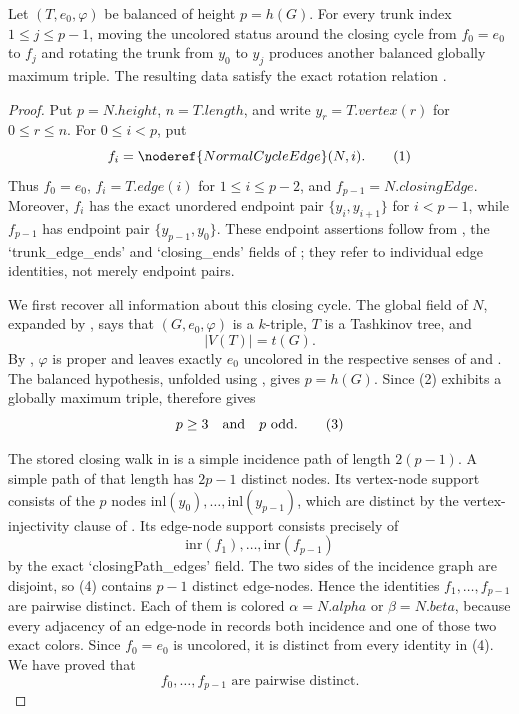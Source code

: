 \begin{lemma}
Let $(T,e_0,\varphi)$ be balanced of height $p=h(G)$.  For every trunk
index $1\le j\le p-1$, moving the uncolored status around the closing cycle
from $f_0=e_0$ to $f_j$ and rotating the trunk from $y_0$ to $y_j$
produces another balanced globally maximum triple.  The resulting data
satisfy the exact rotation relation .
\end{lemma}
\begin{proof}
Put $p=N.height$, $n=T.length$, and write
$y_r=T.vertex(r)$ for $0\leq r\leq n$.  For $0\leq i<p$, put
\[
             f_i=\noderef{NormalCycleEdge}(N,i).
                                                               \tag{1}
\]
Thus $f_0=e_0$, $f_i=T.edge(i)$ for $1\leq i\leq p-2$, and
$f_{p-1}=N.closingEdge$.  Moreover, $f_i$ has the exact unordered
endpoint pair $\{y_i,y_{i+1}\}$ for $i<p-1$, while $f_{p-1}$ has
endpoint pair $\{y_{p-1},y_0\}$.  These endpoint assertions follow from
, the `trunk_edge_ends' and `closing_ends'
fields of ; they refer to individual
edge identities, not merely endpoint pairs.

We first recover all information about this closing cycle.  The global
field of $N$, expanded by , says that
$(G,e_0,\varphi)$ is a $k$-triple, $T$ is a Tashkinov tree, and
\[
                         |V(T)|=t(G).                            \tag{2}
\]
By , $\varphi$ is proper and leaves exactly $e_0$
uncolored in the respective senses of
 and
.  The balanced hypothesis, unfolded using
, gives $p=h(G)$.  Since (2)
exhibits a globally maximum triple, 
therefore gives
\[
                         p\geq3\quad\hbox{and}\quad p\text{ odd}. \tag{3}
\]

The stored closing walk in  is a
simple incidence path of length $2(p-1)$.  A simple path of that length
has $2p-1$ distinct nodes.  Its vertex-node support consists of the $p$
nodes $\mathrm{inl}(y_0),\ldots,\mathrm{inl}(y_{p-1})$, which are
distinct by the vertex-injectivity clause of
.  Its edge-node support consists precisely of
\[
       \mathrm{inr}(f_1),\ldots,\mathrm{inr}(f_{p-1})             \tag{4}
\]
by the exact `closingPath_edges' field.  The two sides of the incidence
graph are disjoint, so (4) contains $p-1$ distinct edge-nodes.  Hence the
identities $f_1,\ldots,f_{p-1}$ are pairwise distinct.  Each of them is
colored $\alpha=N.alpha$ or $\beta=N.beta$, because every adjacency of
an edge-node in  records both incidence
and one of those two exact colors.  Since $f_0=e_0$ is uncolored, it is
distinct from every identity in (4).  We have proved that
\[
                  f_0,\ldots,f_{p-1}\text{ are pairwise distinct}. \tag{5}
\]


\end{proof}

